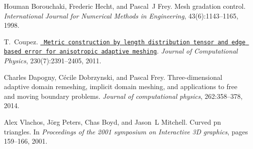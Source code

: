 
\begin{DoxyDescription}
\item[\label{citelist_CITEREF_borouchaki1998mesh}%
\Hypertarget{citelist_CITEREF_borouchaki1998mesh}%
\mbox{[}1\mbox{]}]Houman Borouchaki, Frederic Hecht, and Pascal~J Frey. Mesh gradation control. {\itshape International Journal for Numerical Methods in Engineering}, 43(6)\+:1143--1165, 1998.


\item[\label{citelist_CITEREF_COUPEZ20112391}%
\Hypertarget{citelist_CITEREF_COUPEZ20112391}%
\mbox{[}2\mbox{]}]T.~Coupez. \href{https://www.sciencedirect.com/science/article/pii/S002199911000656X}{\texttt{ Metric construction by length distribution tensor and edge based error for anisotropic adaptive meshing}}. {\itshape Journal of Computational Physics}, 230(7)\+:2391--2405, 2011. 


\item[\label{citelist_CITEREF_dapogny2014three}%
\Hypertarget{citelist_CITEREF_dapogny2014three}%
\mbox{[}3\mbox{]}]Charles Dapogny, C\'{e}cile Dobrzynski, and Pascal Frey. Three-\/dimensional adaptive domain remeshing, implicit domain meshing, and applications to free and moving boundary problems. {\itshape Journal of computational physics}, 262\+:358--378, 2014.


\item[\label{citelist_CITEREF_vlachos2001curved}%
\Hypertarget{citelist_CITEREF_vlachos2001curved}%
\mbox{[}4\mbox{]}]Alex Vlachos, J\"{o}rg Peters, Chas Boyd, and Jason~L Mitchell. Curved pn triangles. In {\itshape Proceedings of the 2001 symposium on Interactive 3D graphics}, pages 159--166, 2001.


\end{DoxyDescription}